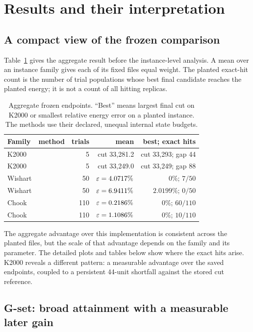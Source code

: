 \section{Results and their interpretation}
\label{sec:results}

\subsection{A compact view of the frozen comparison}

Table~\ref{tab:overview} gives the aggregate result before the
instance-level analysis. A mean over an instance family gives each of
its fixed files equal weight. The planted exact-hit count is the number
of trial populations whose best final candidate reaches the planted
energy; it is not a count of all hitting replicas.

\begin{table}[t]
\centering\small
\caption{Aggregate frozen endpoints. ``Best'' means largest final cut on
K2000 or smallest relative energy error on a planted instance. The
methods use their declared, unequal internal state budgets.}
\label{tab:overview}
\begin{tabular*}{\textwidth}{@{\extracolsep{\fill}}llrrr}
\toprule
Family & method & trials & mean & best; exact hits\\
\midrule
K2000 & \QeFEM{} & 5 & cut 33,281.2 & cut 33,293; gap 44\\
K2000 & \LQA{} & 5 & cut 33,249.0 & cut 33,249; gap 88\\
Wishart & \QeFEM{} & 50 & $\varepsilon=4.0717\%$ & $0\%$; $7/50$\\
Wishart & \LQA{} & 50 & $\varepsilon=6.9411\%$ & $2.0199\%$; $0/50$\\
Chook & \QeFEM{} & 110 & $\varepsilon=0.2186\%$ & $0\%$; $60/110$\\
Chook & \LQA{} & 110 & $\varepsilon=1.1086\%$ & $0\%$; $10/110$\\
\bottomrule
\end{tabular*}
\end{table}

The aggregate advantage over this \LQA{} implementation is consistent
across the planted files, but the scale of that advantage depends on the
family and its parameter. The detailed plots and tables below show where
the exact hits arise. K2000 reveals a different pattern: a measurable
advantage over the saved \LQA{} endpoints, coupled to a persistent
44-unit shortfall against the stored cut reference.

\subsection{G-set: broad attainment with a measurable later gain}

